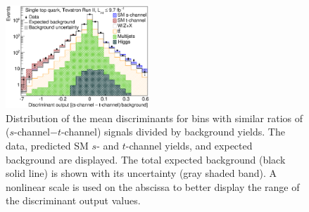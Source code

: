 \documentclass[aps,prl,twocolumn,showpacs,superscriptaddress,groupedaddress]{revtex4}  %
\begin{document}
\begin{figure}[!h!tbp]
\begin{center}
\includegraphics[width=0.48\textwidth]{fig01.eps}
\caption{Distribution of the mean discriminants for bins
  with similar ratios of ($s$-channel$-$$t$-channel) signals divided by
  background yields. The data,
  predicted SM $s$- and $t$-channel yields, and expected background
  are displayed. The total expected background (black solid line) is
  shown with its uncertainty (gray shaded band). A nonlinear scale is
  used on the abscissa to better display the range of the discriminant
  output values.}
\label{fig:TevtbtqbSubtrLog}
\end{center}
\end{figure}
\end{document}
